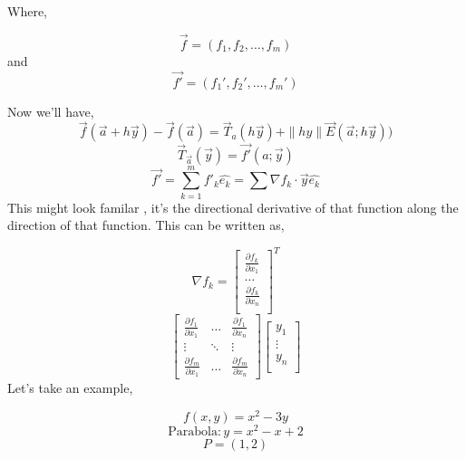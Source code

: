 \documentclass[twoside]{report}
\begin{document}
Where, 

\[ \vec{f} = (f_1,f_2,\dots, f_m)\]
and 
\[\vec{f'} = (f_1',f_2',\dots, f_m')\]

Now we'll have, 
\[ \vec{f}(\vec{a} + h \vec{y}) - \vec{f}(\vec{a}) = \vec{T}_a (h \vec{y}) + \|hy\| \vec{E}(\vec{a};h\vec{y})) \]
\[
	\vec{T}_{\vec{a}}(\vec{y}) = \vec{f'}(a;\vec{y})
\]
\[ 
	\vec{f'} = \sum_{k=1}^m f'_k \hat{e_k} = \sum \nabla f_k \cdot \vec{y} \hat{e_k}
\]
This might look familar , it's the directional derivative of that function along the direction of that function. This can be written as,

\[
\nabla f_k = 
\begin{bmatrix} \frac{\partial f_k}{\partial x_1} \\ \dots \\ \frac{\partial f_k}{\partial x_n} \\ \end{bmatrix}^T \] \[
\begin{bmatrix}
	\frac{\partial f_1}{\partial x_1} & \dots & \frac{\partial f_1}{\partial x_n} \\
	\vdots & \ddots & \vdots \\
	\frac{\partial f_m}{\partial x_1} & \dots & \frac{\partial f_m}{\partial x_n}
\end{bmatrix}
\begin{bmatrix}
	y_1 \\ 
	\vdots \\
	y_n \\
\end{bmatrix}
\]
Let's take an example,

\[
	f(x,y) = x^2 - 3y 
\]
\[ 
	\text{Parabola}: y = x^2 - x + 2
\]
\[
	P = (1,2)
\]
\end{document}
